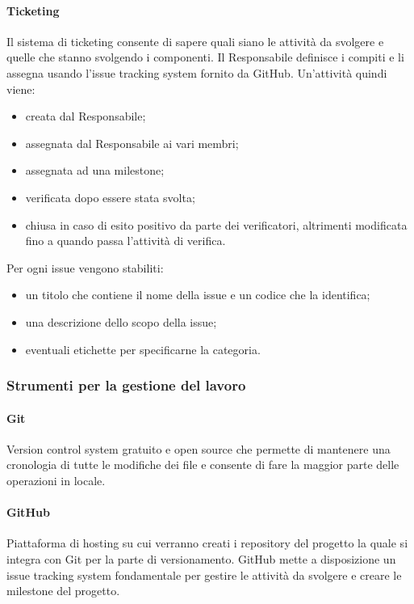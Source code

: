 \paragraph{Ticketing} \hfill \break
Il sistema di ticketing consente di sapere quali siano le attività da svolgere e quelle che stanno svolgendo i componenti.
Il Responsabile definisce i compiti e li assegna usando l'issue tracking system fornito da GitHub. Un'attività quindi viene:
\begin{itemize}
    \item creata dal Responsabile;
    \item assegnata dal Responsabile ai vari membri;
    \item assegnata ad una milestone;
    \item verificata dopo essere stata svolta;
    \item chiusa in caso di esito positivo da parte dei verificatori, altrimenti modificata fino a quando passa l'attività di verifica. 
\end{itemize}
Per ogni issue vengono stabiliti:
\begin{itemize}
    \item un titolo che contiene il nome della issue e un codice che la identifica;
    \item una descrizione dello scopo della issue;
    \item eventuali etichette per specificarne la categoria.
\end{itemize}

\subsubsection{Strumenti per la gestione del lavoro}
\paragraph{Git} \hfill \break
Version control system gratuito e open source che permette di mantenere una cronologia di tutte le modifiche dei file e consente
di fare la maggior parte delle operazioni in locale.

\paragraph{GitHub} \hfill \break
Piattaforma di hosting su cui verranno creati i repository del progetto la quale si integra con Git per la parte di versionamento. 
GitHub mette a disposizione un issue tracking system fondamentale per gestire le attività da svolgere e creare le milestone del progetto.